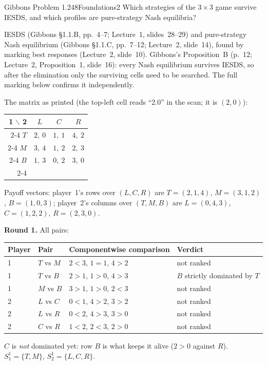 \begin{exsol}{Gibbons Problem 1.2}{48}{Foundations}{2}
\asked Which strategies of the $3\times3$ game survive IESDS, and which profiles are pure-strategy
Nash equilibria?

\method IESDS (Gibbons \S1.1.B, pp.~4--7; Lecture~1, slides~28--29) and pure-strategy Nash
equilibrium (Gibbons \S1.1.C, pp.~7--12; Lecture~2, slide~14), found by marking best responses
(Lecture~2, slide~10). Gibbons's Proposition~B (p.~12; Lecture~2, Proposition~1, slide~16): every
Nash equilibrium survives IESDS, so after the elimination only the surviving cells need to be
searched. The full marking below confirms it independently.

\solution
The matrix as printed (the top-left cell reads ``2.0'' in the scan; it is $(2,0)$):
\begin{center}
\begin{tabular}{r|c|c|c|}
\multicolumn{1}{r}{1 $\backslash$ 2} & \multicolumn{1}{c}{$L$} & \multicolumn{1}{c}{$C$} & \multicolumn{1}{c}{$R$}\\ \cline{2-4}
$T$ & $2,\ 0$ & $1,\ 1$ & $4,\ 2$ \\ \cline{2-4}
$M$ & $3,\ 4$ & $1,\ 2$ & $2,\ 3$ \\ \cline{2-4}
$B$ & $1,\ 3$ & $0,\ 2$ & $3,\ 0$ \\ \cline{2-4}
\end{tabular}
\end{center}
Payoff vectors: player~1's rows over $(L,C,R)$ are $T = (2,1,4)$, $M = (3,1,2)$, $B = (1,0,3)$;
player~2's columns over $(T,M,B)$ are $L = (0,4,3)$, $C = (1,2,2)$, $R = (2,3,0)$.

\textbf{Round 1.} All pairs:
\begin{center}\small
\begin{tabular}{llll}
\toprule
Player & Pair & Componentwise comparison & Verdict \\
\midrule
1 & $T$ vs $M$ & $2<3$, $1=1$, $4>2$ & not ranked \\
1 & $T$ vs $B$ & $2>1$, $1>0$, $4>3$ & $B$ strictly dominated by $T$ \\
1 & $M$ vs $B$ & $3>1$, $1>0$, $2<3$ & not ranked \\
2 & $L$ vs $C$ & $0<1$, $4>2$, $3>2$ & not ranked \\
2 & $L$ vs $R$ & $0<2$, $4>3$, $3>0$ & not ranked \\
2 & $C$ vs $R$ & $1<2$, $2<3$, $2>0$ & not ranked \\
\bottomrule
\end{tabular}
\end{center}
$C$ is \emph{not} dominated yet: row $B$ is what keeps it alive ($2 > 0$ against $R$).
$S_1^1 = \{T, M\}$, $S_2^1 = \{L, C, R\}$.


\end{exsol}
